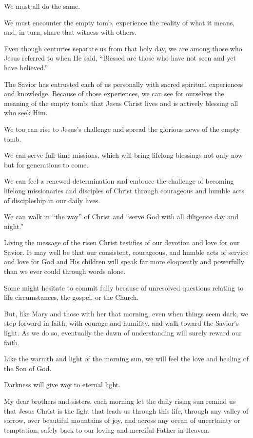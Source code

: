 \documentclass[letterpaper, 11pt]{report}
\newcommand{\intalkheader}[1]{
    \vspace{0.75em}
    \noindent{\normalsize\bfseries #1}
    \par\nopagebreak %
    \vspace{0.25em}
    \nopagebreak     %
}
\begin{document}
We must all do the same.

We must encounter the empty tomb, experience the reality of what it means, and, in turn, share that witness with others.

Even though centuries separate us from that holy day, we are among those who Jesus referred to when He said, “Blessed are those who have not seen and yet have believed.”

The Savior has entrusted each of us personally with sacred spiritual experiences and knowledge. Because of those experiences, we can see for ourselves the meaning of the empty tomb: that Jesus Christ lives and is actively blessing all who seek Him.

We too can rise to Jesus’s challenge and spread the glorious news of the empty tomb.

We can serve full-time missions, which will bring lifelong blessings not only now but for generations to come.

We can feel a renewed determination and embrace the challenge of becoming lifelong missionaries and disciples of Christ through courageous and humble acts of discipleship in our daily lives.

We can walk in “the way” of Christ and “serve God with all diligence day and night.”

Living the message of the risen Christ testifies of our devotion and love for our Savior. It may well be that our consistent, courageous, and humble acts of service and love for God and His children will speak far more eloquently and powerfully than we ever could through words alone.

Some might hesitate to commit fully because of unresolved questions relating to life circumstances, the gospel, or the Church.

But, like Mary and those with her that morning, even when things seem dark, we step forward in faith, with courage and humility, and walk toward the Savior’s light. As we do so, eventually the dawn of understanding will surely reward our faith.

Like the warmth and light of the morning sun, we will feel the love and healing of the Son of God.

Darkness will give way to eternal light.

\intalkheader{A Disciple’s Journey}

My dear brothers and sisters, each morning let the daily rising sun remind us that Jesus Christ is the light that leads us through this life, through any valley of sorrow, over beautiful mountains of joy, and across any ocean of uncertainty or temptation, safely back to our loving and merciful Father in Heaven.
\end{document}
